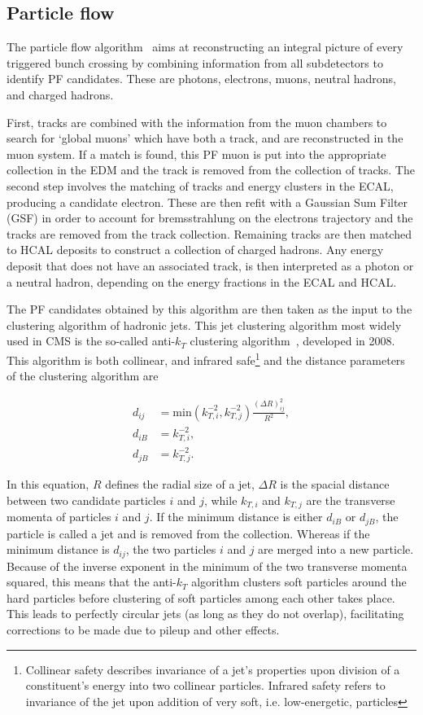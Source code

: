 \subsection{Particle flow}
\label{sub:pf}
The particle flow algorithm~\cite{cmspf} aims at reconstructing an integral picture of every triggered bunch crossing by combining information from all subdetectors to identify
PF candidates. These are photons, electrons, muons, neutral hadrons, and charged hadrons. 

First, tracks are combined with the information from the muon chambers 
to search for `global muons' which have both a track, and are reconstructed in the muon system. If a match is found, this PF muon is put into the appropriate collection in the EDM
and the track is removed from the collection of tracks. The second step involves the matching of tracks and energy clusters in the ECAL, producing a candidate electron. These are then
refit with a Gaussian Sum Filter (GSF) in order to account for bremsstrahlung on the electrons trajectory and the tracks are removed from the track collection. Remaining tracks are
then matched to HCAL deposits to construct a collection of charged hadrons. Any energy deposit that does not have an associated track, is then interpreted as a photon or a neutral
hadron, depending on the energy fractions in the ECAL and HCAL. 

The PF candidates obtained by this algorithm are then taken as the input to the clustering algorithm of hadronic jets. This jet clustering algorithm most widely used in CMS
is the so-called anti-$k_T$ clustering algorithm~\cite{antikt}, developed in 2008. This algorithm is both collinear, and infrared safe\footnote{Collinear safety describes invariance
of a jet's properties upon division of a constituent's energy into two collinear particles. Infrared safety refers to invariance of the jet upon addition of very soft, i.e. low-energetic,
particles} and the distance parameters of the clustering algorithm are

\begin{align}
    d_{ij} & = \text{min}\left( k_{T,i}^{-2}, k_{T,j}^{-2} \right) \frac{ (\Delta R)^2_{ij}}{R^2}, \\
    d_{iB} & = k_{T,i}^{-2}, \\
    d_{jB} & = k_{T,j}^{-2}.
\end{align}

In this equation, $R$ defines the radial size of a jet, $\Delta R$ is the spacial distance between two candidate particles $i$ and $j$, while $k_{T,i}$ and $k_{T,j}$ are the transverse
momenta of particles $i$ and $j$. If the minimum distance is either $d_{iB}$ or $d_{jB}$, the particle is called a jet and is removed from the collection. Whereas if the minimum distance
is $d_{ij}$, the two particles $i$ and $j$ are merged into a new particle. Because of the inverse exponent in the minimum of the two transverse momenta squared, this means that the 
anti-$k_T$ algorithm clusters soft particles around the hard particles before clustering of soft particles among each other takes place. This leads to perfectly circular jets (as long as
they do not overlap), facilitating corrections to be made due to pileup and other effects.

